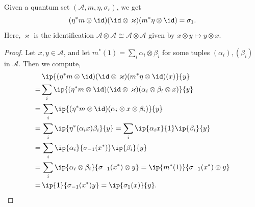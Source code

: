  \begin{proposition}\label{modAut_one_eq_left_twist}
  \leanok
  Given a quantum set $(\mathcal{A},m,\eta,\sigma_r)$, we get
  \[(\eta^*m\otimes\id)(\id\otimes\,\varkappa)(m^*\eta\otimes\id)=\sigma_1.\]
  Here, $\varkappa$ is the identification $\mathcal{A}\otimes\mathcal{A}\cong\mathcal{A}\otimes\mathcal{A}$ given by $x\otimes y\mapsto y\otimes x$.
 \end{proposition}
 \begin{proof}\leanok
  Let $x,y\in\mathcal{A}$, and let $m^*(1)=\sum_i\alpha_i\otimes\beta_i$ for some tuples $(\alpha_i),(\beta_i)$ in $\mathcal{A}$.
  Then we compute,
  \begin{align*}
   &\,\ip{(\eta^*m\otimes\id)(\id\otimes\,\varkappa)(m^*\eta\otimes\id)(x)}{y}\\
   =& \sum_i\ip{(\eta^*m\otimes\id)(\id\otimes\,\varkappa)(\alpha_i\otimes\beta_i\otimes x)}{y}\\
   =&\, \sum_i\ip{(\eta^*m\otimes\id)(\alpha_i\otimes x\otimes \beta_i)}{y}\\
   =&\, \sum_i\ip{\eta^*(\alpha_ix)\beta_i}{y}
   = \sum_i\ip{\alpha_ix}{1}\ip{\beta_i}{y}\\
   =&\, \sum_i\ip{\alpha_i}{\sigma_{-1}(x^*)}\ip{\beta_i}{y}\\
   =&\, \sum_i\ip{\alpha_i\otimes\beta_i}{\sigma_{-1}(x^*)\otimes y}=\ip{m^*(1)}{\sigma_{-1}(x^*)\otimes y}\\
   =&\, \ip{1}{\sigma_{-1}(x^*)y}=\ip{\sigma_{1}(x)}{y}.
  \end{align*}
 \end{proof}


